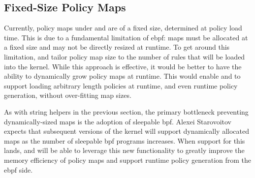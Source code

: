 \subsection{Fixed-Size Policy Maps}

Currently, policy maps under \bpfbox{} and \bpfcontain{} are of a fixed size, determined
at policy load time. This is due to a fundamental limitation of \gls{ebpf}: maps must be
allocated at a fixed size and may not be directly resized at runtime. To get around this
limitation, \bpfbox{} and \bpfcontain{} tailor policy map size to the number of rules that
will be loaded into the kernel. While this approach is effective, it would be better to
have the ability to dynamically grow policy maps at runtime. This would enable \bpfbox{}
and \bpfcontain{} to support loading arbitrary length policies at runtime, and even
runtime policy generation, without over-fitting map sizes.

As with string helpers in the previous section, the primary bottleneck preventing
dynamically-sized maps is the adoption of sleepable \gls{bpf}. Alexei Starovoitov expects
that subsequent versions of the kernel will support dynamically allocated maps as the
number of sleepable \gls{bpf} programs increases. When support for this lands, \bpfbox{}
and \bpfcontain{} will be able to leverage this new functionality to greatly improve the
memory efficiency of policy maps and support runtime policy generation from the \gls{ebpf}
side.


